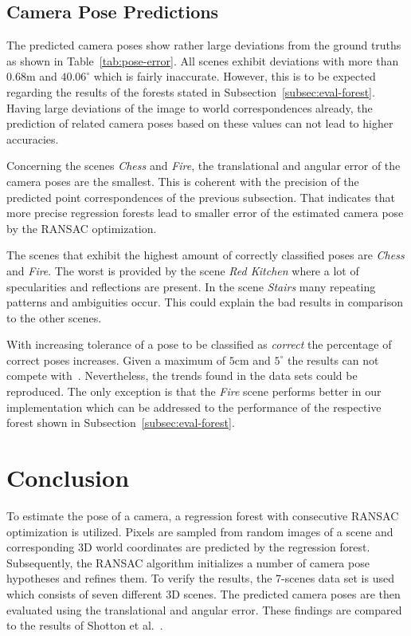\documentclass[final]{cvpr}
\begin{document}
\subsection{Camera Pose Predictions}
The predicted camera poses show rather large deviations from the ground truths as shown in Table~\ref{tab:pose-error}.
All scenes exhibit deviations with more than $0.68$m and $40.06^\circ$ which is fairly inaccurate. However, this is
to be expected regarding the results of the forests stated in Subsection~\ref{subsec:eval-forest}. Having large deviations 
of the image to world correspondences already, the prediction of related camera poses based on these values can not lead
to higher accuracies. 

Concerning the scenes \textit{Chess} and \textit{Fire}, the translational and angular error of the camera poses 
are the smallest. 
This is coherent with the precision of the predicted point correspondences of the previous subsection. 
That indicates that more precise regression forests lead to smaller error of the estimated camera pose 
by the RANSAC optimization. 

The scenes that exhibit the highest amount of correctly classified poses are \textit{Chess} and \textit{Fire}. 
The worst is provided by the scene \textit{Red Kitchen} where a lot of specularities and reflections are 
present. In the scene \textit{Stairs} many repeating patterns and ambiguities occur. This could explain the bad results 
in comparison to the other scenes.

With increasing tolerance of a pose to be classified as \textit{correct} the percentage of correct poses increases. 
Given a maximum of $5$cm and $5^\circ$ the results can not compete with~\cite{shotton2013}. Nevertheless, the trends found in 
the data sets could be reproduced. The only exception is that the \textit{Fire} scene performs better in our implementation 
which can be addressed to the performance of the respective forest shown in Subsection~\ref{subsec:eval-forest}.


\section{Conclusion}
To estimate the pose of a camera, a regression forest with consecutive RANSAC optimization is utilized. Pixels are sampled from
random images of a scene and corresponding 3D world coordinates are predicted by the regression forest. Subsequently, 
the RANSAC algorithm initializes a number of camera pose hypotheses and refines them. To verify the results, the 7-scenes data 
set is used which consists of seven different 3D scenes. The predicted camera poses are then evaluated
using the translational and angular error. These findings are compared to the results of Shotton et 
al.~\cite{shotton2013}. 
\end{document}
